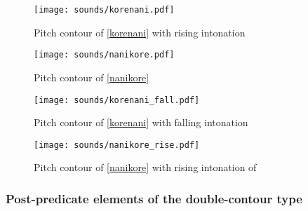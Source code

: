 \begin{figure}
	\begin{center}
	\texttt{[image: sounds/korenani.pdf]}
	\caption{Pitch contour of  \ref{korenani} with rising intonation}
	\label{korenaniF}
	\end{center}
\end{figure}
\begin{figure}
	\begin{center}
	\texttt{[image: sounds/nanikore.pdf]}
	\caption{Pitch contour of  \ref{nanikore}}
	\label{nanikoreF}
	\end{center}
\end{figure}
\begin{figure}
	\begin{center}
	\texttt{[image: sounds/korenani\_fall.pdf]}
	\caption{Pitch contour of  \ref{korenani} with falling intonation}
	\label{korenani_fallF}
	\end{center}
\end{figure}
\begin{figure}
	\begin{center}
	\texttt{[image: sounds/nanikore\_rise.pdf]}
	\caption{Pitch contour of  \ref{nanikore} with rising intonation of }
	\label{nanikore_riseF}
	\end{center}
\end{figure}

\subsubsection{Post-predicate elements of the double-contour type}\label{WO:PostP:Motiv:Double}

